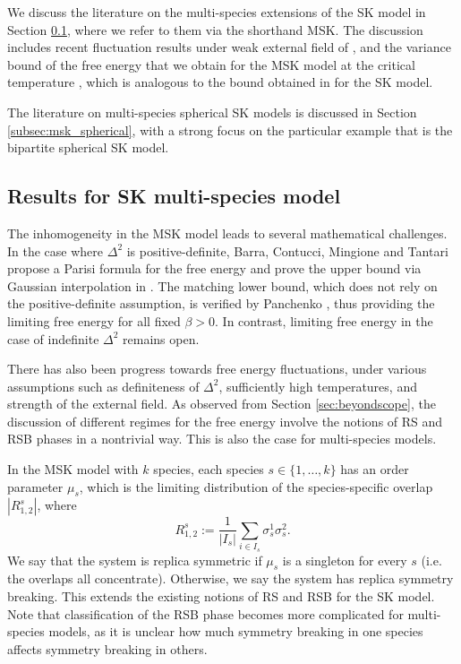 \documentclass[11pt]{article}
\numberwithin{equation}{section}
\def \b {\beta}
\def \s {\sigma}
\theoremstyle{remark}
\begin{document}
We discuss the literature on the multi-species extensions of the SK model in Section \ref{subsec:msk}, where we refer to them via the shorthand MSK. The discussion includes recent fluctuation results under weak external field of \cite{DeyWu23}, and the variance bound of the free energy that we obtain for the MSK model at the critical temperature \cite{CWL_variancebound}, which is analogous to the bound obtained in \cite{ChenLam19} for the SK model. 

The literature on multi-species spherical SK models is discussed in Section \ref{subsec:msk_spherical}, with a strong focus on the particular example that is the bipartite spherical SK model. 

\subsection{Results for SK multi-species model}\label{subsec:msk}


The inhomogeneity in the MSK model leads to several mathematical challenges. In the case where $\Delta^2$ is positive-definite, Barra, Contucci, Mingione and Tantari propose a Parisi formula for the free energy and prove the upper bound via Gaussian interpolation in \cite{Barra15}. The matching lower bound, which does not rely on the positive-definite assumption, is verified by Panchenko \cite{Panchenko15}, thus providing the limiting free energy for all fixed $\b>0$. In contrast, limiting free energy in the case of indefinite $\Delta^2$ remains open. 

There has also been progress towards free energy fluctuations, under various assumptions such as definiteness of $\Delta^2$, sufficiently high temperatures, and strength of the external field. As observed from Section \ref{sec:beyondscope}, the discussion of different regimes for the free energy involve the notions of RS and RSB phases in a nontrivial way. This is also the case for multi-species models. 

In the MSK model with $k$ species, each species $s \in \{1, \dots, k\}$ has an order parameter $\mu_s$, which is the limiting distribution of the species-specific overlap $|R_{1,2}^s|$, where 
\[
R_{1,2}^s :=\frac{1}{|I_s|}\sum_{i \in I_s} \s^1_s\s^2_s.
\]
We say that the system is replica symmetric if $\mu_s$ is a singleton for every $s$ (i.e. the overlaps all concentrate). Otherwise, we say the system has replica symmetry breaking. This extends the existing notions of RS and RSB for the SK model. Note that classification of the RSB phase becomes more complicated for multi-species models, as it is unclear how much symmetry breaking in one species affects symmetry breaking in others. 
\end{document}
